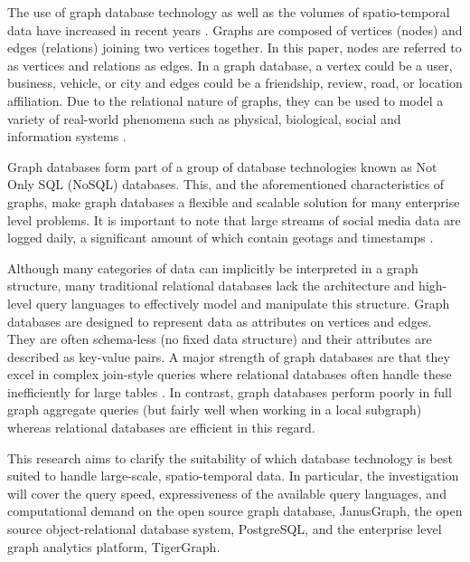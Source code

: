The use of graph database technology as well as the volumes of spatio-temporal data have increased in recent years \cite{mongovspostgres}. Graphs are composed of vertices (nodes) and edges (relations) joining two vertices together. In this paper, nodes are referred to as vertices and relations as edges. In a graph database, a vertex could be a user, business, vehicle, or city and edges could be a friendship, review, road, or location affiliation. Due to the relational nature of graphs, they can be used to model a variety of real-world phenomena such as physical, biological, social and information systems \cite{socialdata}.

Graph databases form part of a group of database technologies known as Not Only SQL (NoSQL) databases. This, and the aforementioned characteristics of graphs, make graph databases a flexible and scalable solution for many enterprise level problems. It is important to note that large streams of social media data are logged daily, a significant amount of which contain geotags and timestamps \cite{twitterdata}.

Although many categories of data can implicitly be interpreted in a graph structure, many traditional relational databases lack the architecture and high-level query languages to effectively model and manipulate this structure. Graph databases are designed to represent data as attributes on vertices and edges. They are often schema-less (no fixed data structure) and their attributes are described as key-value pairs. A major strength of graph databases are that they excel in complex join-style queries where relational databases often handle these inefficiently for large tables \cite{data-in-nosql}. In contrast, graph databases perform poorly in full graph aggregate queries (but fairly well when working in a local subgraph) whereas relational databases are efficient in this regard.

This research aims to clarify the suitability of which database technology is best suited to handle large-scale, spatio-temporal data. In particular, the investigation will cover the query speed, expressiveness of the available query languages, and computational demand on the open source graph database, JanusGraph, the open source object-relational database system, PostgreSQL, and the enterprise level graph analytics platform, TigerGraph.


